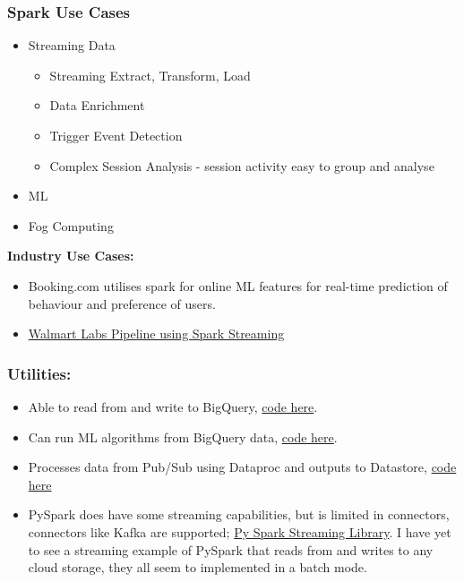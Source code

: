 \documentclass[english]{article}
\begin{document}
\subsubsection{Spark Use Cases}
\begin{itemize}
\item Streaming Data
	\begin{itemize}
		\item Streaming Extract, Transform, Load
		\item Data Enrichment
		\item Trigger Event Detection
		\item Complex Session Analysis - session activity easy to group and analyse
	\end{itemize}
\item ML
\item Fog Computing
\end{itemize}
\textbf{Industry Use Cases:}
\begin{itemize}
\item Booking.com utilises spark for online ML features for real-time prediction of behaviour and preference of users.
\item \href{https://medium.com/walmartlabs/how-we-built-a-data-pipeline-with-lambda-architecture-using-spark-spark-streaming-9d3b4b4555d3}{Walmart Labs Pipeline using Spark Streaming}
\end{itemize}
\subsubsection{Utilities:}
\begin{itemize}
\item Able to read from and write to BigQuery, \href{https://cloud.google.com/dataproc/docs/tutorials/bigquery-connector-spark-example}{code here}.
\item Can run ML algorithms from BigQuery data, \href{https://cloud.google.com/dataproc/docs/tutorials/bigquery-sparkml#spark-ml-tutorial_subset-python}{code here}.
\item Processes data from Pub/Sub using Dataproc and outputs to Datastore, \href{https://cloud.google.com/solutions/using-apache-spark-dstreams-with-dataproc-and-pubsub#whats-next}{code here}
\item PySpark does have some streaming capabilities, but is limited in connectors, connectors like Kafka are supported; \href{https://spark.apache.org/docs/1.5.2/api/python/pyspark.streaming.html}{Py Spark Streaming Library}. I have yet to see a streaming example of PySpark that reads from and writes to any cloud storage, they all seem to implemented in a batch mode.
\end{itemize}
\end{document}
